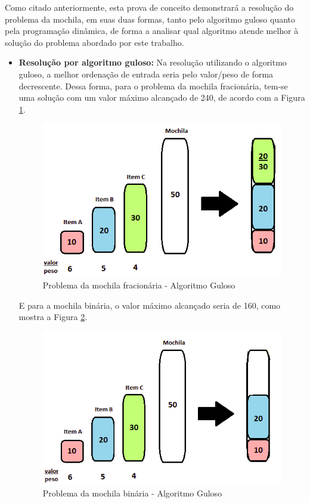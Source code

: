 Como citado anteriormente, esta prova de conceito demonstrará a resolução do problema da mochila, em suas duas formas, tanto pelo algoritmo guloso quanto pela programação dinâmica, de forma a analisar qual algoritmo atende melhor à solução do problema abordado por este trabalho. 

\begin{itemize}
\item \textbf{Resolução por algoritmo guloso:} Na resolução utilizando o algoritmo guloso, a melhor ordenação de entrada seria pelo valor/peso de forma decrescente. Dessa forma, para o problema da mochila fracionária, tem-se uma solução com um valor máximo alcançado de 240, de acordo com a Figura \ref{mochila}.

\clearpage

\FloatBarrier
\begin{figure}[!h]
\centering
\includegraphics[keepaspectratio=true,scale=0.5]{figuras/mochila.png}
\caption{Problema da mochila fracionária - Algoritmo Guloso}
\label{mochila}
\end{figure}

E para a mochila binária, o valor máximo alcançado seria de 160, como mostra a Figura \ref{mochilabinaria}.

\FloatBarrier
\begin{figure}[!h]
\centering
\includegraphics[keepaspectratio=true,scale=0.5]{figuras/mochilabinaria.png}
\caption{Problema da mochila binária - Algoritmo Guloso}
\label{mochilabinaria}
\end{figure}


\end{itemize}
